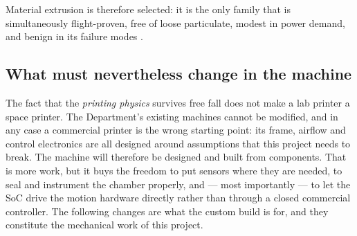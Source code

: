 \documentclass[11pt,a4paper]{article}
\begin{document}
Material extrusion is therefore selected: it is the only family that is
simultaneously flight-proven, free of loose particulate, modest in power demand,
and benign in its failure modes \cite{asme2023review,technologies2026review}.

\subsection{What must nevertheless change in the machine}

The fact that the \emph{printing physics} survives free fall does not make a lab
printer a space printer. The Department's existing machines cannot be modified,
and in any case a commercial printer is the wrong starting point: its frame,
airflow and control electronics are all designed around assumptions that this
project needs to break. The machine will therefore be designed and built from
components. That is more work, but it buys the freedom to put sensors where they
are needed, to seal and instrument the chamber properly, and --- most importantly
--- to let the SoC drive the motion hardware directly rather than through a
closed commercial controller. The following changes are what the custom build is
for, and they constitute the mechanical work of this project.
\end{document}
